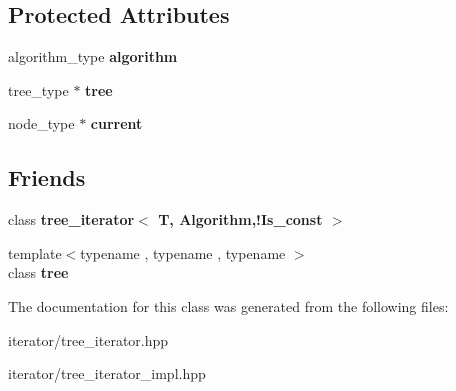 \subsection*{Protected Attributes}
\begin{DoxyCompactItemize}
\item 
algorithm\+\_\+type {\bfseries algorithm}\hypertarget{classds_1_1tree__iterator_a9905c7db4d394e6595591f5678d3a10b}{}\label{classds_1_1tree__iterator_a9905c7db4d394e6595591f5678d3a10b}

\item 
tree\+\_\+type $\ast$ {\bfseries tree}\hypertarget{classds_1_1tree__iterator_a2fc8efa4c3a61f44897e8b7e1ce38f40}{}\label{classds_1_1tree__iterator_a2fc8efa4c3a61f44897e8b7e1ce38f40}

\item 
node\+\_\+type $\ast$ {\bfseries current}\hypertarget{classds_1_1tree__iterator_a01fb77b9f35ec5b0c593afd5de434e81}{}\label{classds_1_1tree__iterator_a01fb77b9f35ec5b0c593afd5de434e81}

\end{DoxyCompactItemize}
\subsection*{Friends}
\begin{DoxyCompactItemize}
\item 
class {\bfseries tree\+\_\+iterator$<$ T, Algorithm,!\+Is\+\_\+const $>$}\hypertarget{classds_1_1tree__iterator_a1e85387951bb4931cc67e99ff66291a3}{}\label{classds_1_1tree__iterator_a1e85387951bb4931cc67e99ff66291a3}

\item 
{\footnotesize template$<$typename , typename , typename $>$ }\\class {\bfseries tree}\hypertarget{classds_1_1tree__iterator_ad7a47147f26926cd831723f2581162e0}{}\label{classds_1_1tree__iterator_ad7a47147f26926cd831723f2581162e0}

\end{DoxyCompactItemize}


The documentation for this class was generated from the following files\+:\begin{DoxyCompactItemize}
\item 
iterator/tree\+\_\+iterator.\+hpp\item 
iterator/tree\+\_\+iterator\+\_\+impl.\+hpp\end{DoxyCompactItemize}
